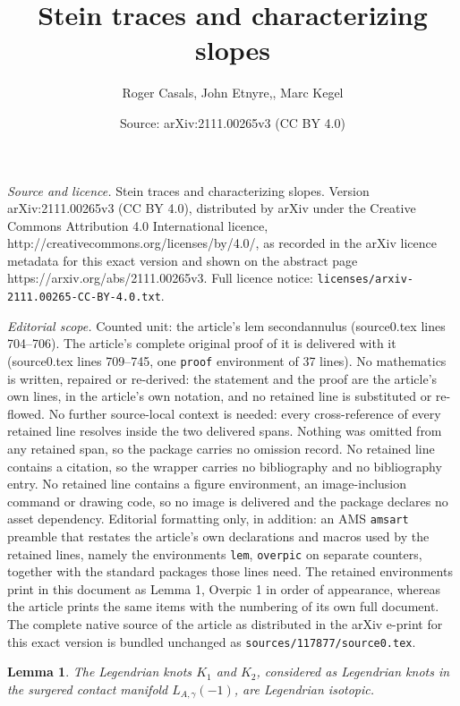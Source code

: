 \documentclass[10pt,a4paper]{amsart}
\title{Stein traces and characterizing slopes}
\author{Roger Casals, John Etnyre,, Marc Kegel}
\date{Source: arXiv:2111.00265v3 (CC BY 4.0)}
\newtheorem{lem}{Lemma}
\begin{document}
\maketitle

\noindent\emph{Source and licence.} Stein traces and characterizing slopes. Version arXiv:2111.00265v3 (CC BY 4.0), distributed by arXiv under the Creative Commons Attribution 4.0 International licence, http://creativecommons.org/licenses/by/4.0/, as recorded in the arXiv licence metadata for this exact version and shown on the abstract page https://arxiv.org/abs/2111.00265v3. Full licence notice: \texttt{licenses/arxiv-2111.00265-CC-BY-4.0.txt}.\par\smallskip

\noindent\textit{Editorial scope.} Counted unit: the article's lem secondannulus (source0.tex lines 704--706). The article's complete original proof of it is delivered with it (source0.tex lines 709--745, one \texttt{proof} environment of 37 lines). No mathematics is written, repaired or re-derived: the statement and the proof are the article's own lines, in the article's own notation, and no retained line is substituted or re-flowed.  No further source-local context is needed: every cross-reference of every retained line resolves inside the two delivered spans.  Nothing was omitted from any retained span, so the package carries no omission record.  No retained line contains a citation, so the wrapper carries no bibliography and no bibliography entry.  No retained line contains a figure environment, an image-inclusion command or drawing code, so no image is delivered and the package declares no asset dependency.  Editorial formatting only, in addition: an AMS \texttt{amsart} preamble that restates the article's own declarations and macros used by the retained lines, namely the environments \texttt{lem}, \texttt{overpic} on separate counters, together with the standard packages those lines need.  The retained environments print in this document as Lemma 1, Overpic 1 in order of appearance, whereas the article prints the same items with the numbering of its own full document.  The complete native source of the article as distributed in the arXiv e-print for this exact version is bundled unchanged as \texttt{sources/117877/source0.tex}.
\begin{lem}\label{secondannulus}
 The Legendrian knots $K_1$ and $K_2$, considered as Legendrian knots in the surgered contact manifold $L_{A,\gamma}(-1)$, are Legendrian isotopic.
\end{lem}
\end{document}
